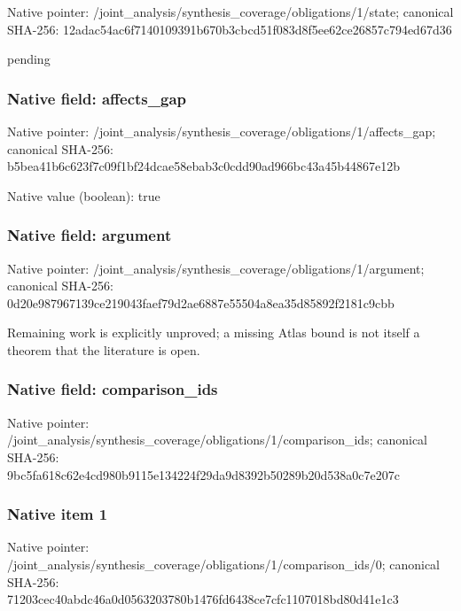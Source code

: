 \documentclass[10pt,a4paper]{article}
\begin{document}
Native pointer: /joint\_analysis/synthesi\allowbreak{}s\_coverage/obligations/1\allowbreak{}/state; canonical SHA-256: 12adac54ac6f7140109391b6\allowbreak{}70b3cbcd51f083d8f5ee62ce\allowbreak{}26857c794ed67d36


pending


\subsubsection{Native field: affects\_gap}


Native pointer: /joint\_analysis/synthesi\allowbreak{}s\_coverage/obligations/1\allowbreak{}/affects\_gap; canonical SHA-256: b5bea41b6c623f7c09f1bf24\allowbreak{}dcae58ebab3c0cdd90ad966b\allowbreak{}c43a45b44867e12b



Native value (boolean): true



\subsubsection{Native field: argument}


Native pointer: /joint\_analysis/synthesi\allowbreak{}s\_coverage/obligations/1\allowbreak{}/argument; canonical SHA-256: 0d20e987967139ce219043fa\allowbreak{}ef79d2ae6887e55504a8ea35\allowbreak{}d85892f2181c9cbb


Remaining work is explicitly unproved; a missing Atlas bound is not itself a theorem that the literature is open.


\subsubsection{Native field: comparison\_ids}


Native pointer: /joint\_analysis/synthesi\allowbreak{}s\_coverage/obligations/1\allowbreak{}/comparison\_ids; canonical SHA-256: 9bc5fa618c62e4cd980b9115\allowbreak{}e134224f29da9d8392b50289\allowbreak{}b20d538a0c7e207c



\subsubsection{Native item 1}


Native pointer: /joint\_analysis/synthesi\allowbreak{}s\_coverage/obligations/1\allowbreak{}/comparison\_ids/0; canonical SHA-256: 71203cec40abdc46a0d05632\allowbreak{}03780b1476fd6438ce7cfc11\allowbreak{}07018bd80d41e1c3
\end{document}
